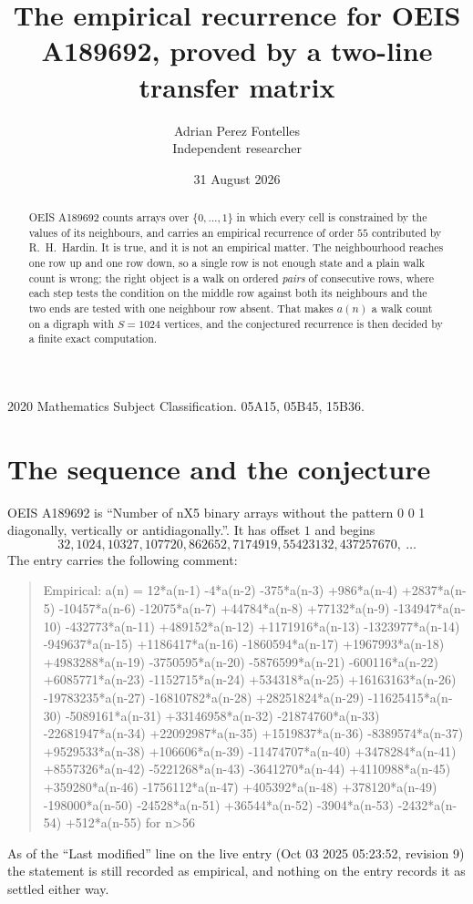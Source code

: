 \documentclass[11pt,a4paper]{article}
\title{The empirical recurrence for OEIS A189692, proved by a two-line transfer matrix}
\author{Adrian Perez Fontelles\\ \small Independent researcher}
\date{31 August 2026}
\theoremstyle{plain}
\theoremstyle{definition}
\begin{document}
\maketitle

\begin{abstract}
OEIS A189692 counts arrays over $\{0,\dots,1\}$ in which every cell is constrained by the
values of its neighbours, and carries an empirical recurrence of order $55$ contributed
by R.~H.~Hardin. It is true, and it is not an empirical matter. The neighbourhood reaches one
row up and one row down, so a single row is not enough state and a plain walk count
is wrong; the right object is a walk on ordered \emph{pairs} of consecutive rows, where
each step tests the condition on the middle row against both its neighbours and the two
ends are tested with one neighbour row absent. That makes $a(n)$ a walk count on a digraph
with $S=1024$ vertices, and the conjectured recurrence is then decided by a finite exact
computation.
\end{abstract}

\noindent\small 2020 Mathematics Subject Classification. 05A15, 05B45, 15B36.\normalsize

\section{The sequence and the conjecture}

OEIS A189692 is ``Number of nX5 binary arrays without the pattern 0 0 1 diagonally, vertically or antidiagonally.''. It has offset $1$ and begins
\[
32, 1024, 10327, 107720, 862652, 7174919, 55423132, 437257670,\ \dots
\]
The entry carries the following comment:
\begin{quote}\small
Empirical: a(n) = 12*a(n-1) -4*a(n-2) -375*a(n-3) +986*a(n-4) +2837*a(n-5) -10457*a(n-6) -12075*a(n-7) +44784*a(n-8) +77132*a(n-9) -134947*a(n-10) -432773*a(n-11) +489152*a(n-12) +1171916*a(n-13) -1323977*a(n-14) -949637*a(n-15) +1186417*a(n-16) -1860594*a(n-17) +1967993*a(n-18) +4983288*a(n-19) -3750595*a(n-20) -5876599*a(n-21) -600116*a(n-22) +6085771*a(n-23) -1152715*a(n-24) +534318*a(n-25) +16163163*a(n-26) -19783235*a(n-27) -16810782*a(n-28) +28251824*a(n-29) -11625415*a(n-30) -5089161*a(n-31) +33146958*a(n-32) -21874760*a(n-33) -22681947*a(n-34) +22092987*a(n-35) +1519837*a(n-36) -8389574*a(n-37) +9529533*a(n-38) +106606*a(n-39) -11474707*a(n-40) +3478284*a(n-41) +8557326*a(n-42) -5221268*a(n-43) -3641270*a(n-44) +4110988*a(n-45) +359280*a(n-46) -1756112*a(n-47) +405392*a(n-48) +378120*a(n-49) -198000*a(n-50) -24528*a(n-51) +36544*a(n-52) -3904*a(n-53) -2432*a(n-54) +512*a(n-55) for n>56
\end{quote}
As of the ``Last modified'' line on the live entry (Oct 03 2025 05:23:52, revision 9) the statement is
still recorded as empirical, and nothing on the entry records it as settled either way.
\end{document}
